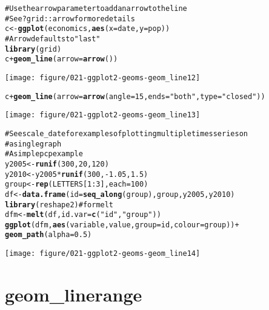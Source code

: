 \documentclass[a4paper,titlepage]{tufte-handout}\usepackage{graphicx, color}
\makeatletter
\def\maxwidth{ %
  \ifdim\Gin@nat@width>\linewidth
    \linewidth
  \else
    \Gin@nat@width
  \fi
}
\newcommand{\hlfunctioncall}[1]{\textcolor[rgb]{0.501960784313725,0,0.329411764705882}{\textbf{#1}}}%
\newcommand{\hlstring}[1]{\textcolor[rgb]{0.6,0.6,1}{#1}}%
\newcommand{\hlcomment}[1]{\textcolor[rgb]{0.180392156862745,0.6,0.341176470588235}{#1}}%
\newenvironment{kframe}{%
 \def\at@end@of@kframe{}%
 \ifinner\ifhmode%
  \def\at@end@of@kframe{\end{minipage}}%
  \begin{minipage}{\columnwidth}%
 \fi\fi%
 \def\FrameCommand##1{\hskip\@totalleftmargin \hskip-\fboxsep
 \colorbox{shadecolor}{##1}\hskip-\fboxsep
     \hskip-\linewidth \hskip-\@totalleftmargin \hskip\columnwidth}%
 \MakeFramed {\advance\hsize-\width
   \@totalleftmargin\z@ \linewidth\hsize
   \@setminipage}}%
 {\par\unskip\endMakeFramed%
 \at@end@of@kframe}
\newenvironment{knitrout}{}{} %
\makeatother
\begin{document}
\begin{knitrout}
\begin{kframe}
\begin{alltt}
\hlcomment{# Use the arrow parameter to add an arrow to the line}
\hlcomment{# See ?grid::arrow for more details}
c <- \hlfunctioncall{ggplot}(economics, \hlfunctioncall{aes}(x = date, y = pop))
# Arrow defaults to \hlstring{"last"}
\hlfunctioncall{library}(grid)
c + \hlfunctioncall{geom_line}(arrow = \hlfunctioncall{arrow}())
\end{alltt}
\end{kframe}\texttt{[image: figure/021-ggplot2-geoms-geom\_line12]} \begin{kframe}\begin{alltt}
c + \hlfunctioncall{geom_line}(arrow = \hlfunctioncall{arrow}(angle = 15, ends = \hlstring{"both"}, type = \hlstring{"closed"}))
\end{alltt}
\end{kframe}\texttt{[image: figure/021-ggplot2-geoms-geom\_line13]} \begin{kframe}\begin{alltt}
\hlcomment{# See scale_date for examples of plotting multiple times series on}
\hlcomment{# a single graph}
\hlcomment{# A simple pcp example}
y2005 <- \hlfunctioncall{runif}(300, 20, 120)
y2010 <- y2005 * \hlfunctioncall{runif}(300, -1.05, 1.5)
group <- \hlfunctioncall{rep}(LETTERS[1:3], each = 100)
df <- \hlfunctioncall{data.frame}(id = \hlfunctioncall{seq_along}(group), group, y2005, y2010)
\hlfunctioncall{library}(reshape2) \hlcomment{# for melt}
dfm <- \hlfunctioncall{melt}(df, id.var = \hlfunctioncall{c}(\hlstring{"id"}, \hlstring{"group"}))
\hlfunctioncall{ggplot}(dfm, \hlfunctioncall{aes}(variable, value, group = id, colour = group)) +
  \hlfunctioncall{geom_path}(alpha = 0.5)
\end{alltt}
\end{kframe}\texttt{[image: figure/021-ggplot2-geoms-geom\_line14]} 
\end{knitrout}


\section{geom\_linerange}
\end{document}
